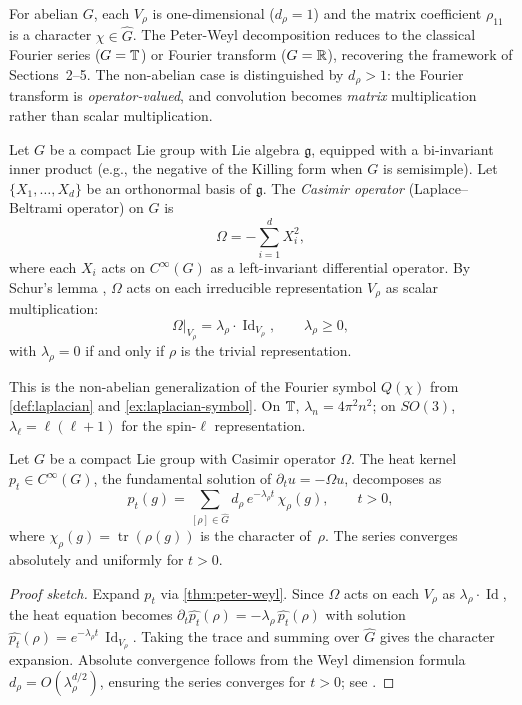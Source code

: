 For abelian $G$, each $V_\rho$ is one-dimensional ($d_\rho = 1$) and the matrix coefficient $\rho_{11}$ is a character $\chi \in \widehat{G}$. The Peter-Weyl decomposition reduces to the classical Fourier series ($G = \mathbb{T}$) or Fourier transform ($G = \mathbb{R}$), recovering the framework of Sections~2--5. The non-abelian case is distinguished by $d_\rho > 1$: the Fourier transform is \emph{operator-valued}, and convolution becomes \emph{matrix} multiplication rather than scalar multiplication.

\begin{definition}\label{def:casimir}
Let $G$ be a compact Lie group with Lie algebra $\mathfrak{g}$, equipped with a bi-invariant inner product (e.g., the negative of the Killing form when $G$ is semisimple). Let $\{X_1, \ldots, X_d\}$ be an orthonormal basis of $\mathfrak{g}$. The \emph{Casimir operator} (Laplace--Beltrami operator) on $G$ is
\[
\Omega = -\sum_{i=1}^d X_i^2,
\]
where each $X_i$ acts on $C^\infty(G)$ as a left-invariant differential operator. By Schur's lemma \cite[Proposition~10.7]{Hall}, $\Omega$ acts on each irreducible representation $V_\rho$ as scalar multiplication:
\[
\Omega\big|_{V_\rho} = \lambda_\rho \cdot \operatorname{Id}_{V_\rho}, \qquad \lambda_\rho \geq 0,
\]
with $\lambda_\rho = 0$ if and only if $\rho$ is the trivial representation.
\end{definition}

This is the non-abelian generalization of the Fourier symbol $Q(\chi)$ from \cref{def:laplacian} and \cref{ex:laplacian-symbol}. On $\mathbb{T}$, $\lambda_n = 4\pi^2 n^2$; on $SO(3)$, $\lambda_\ell = \ell(\ell+1)$ for the spin-$\ell$ representation.

\begin{proposition}\label{prop:heat-compact}
Let $G$ be a compact Lie group with Casimir operator $\Omega$. The heat kernel $p_t \in C^\infty(G)$, the fundamental solution of $\partial_t u = -\Omega u$, decomposes as
\[
p_t(g) = \sum_{[\rho] \in \widehat{G}} d_\rho\, e^{-\lambda_\rho t}\, \chi_\rho(g), \qquad t > 0,
\]
where $\chi_\rho(g) = \operatorname{tr}(\rho(g))$ is the character of~$\rho$. The series converges absolutely and uniformly for $t > 0$.
\end{proposition}

\begin{proof}[Proof sketch]
Expand $p_t$ via \cref{thm:peter-weyl}. Since $\Omega$ acts on each $V_\rho$ as $\lambda_\rho \cdot \operatorname{Id}$, the heat equation becomes $\partial_t \widehat{p_t}(\rho) = -\lambda_\rho\, \widehat{p_t}(\rho)$ with solution $\widehat{p_t}(\rho) = e^{-\lambda_\rho t}\, \operatorname{Id}_{V_\rho}$. Taking the trace and summing over $\widehat{G}$ gives the character expansion. Absolute convergence follows from the Weyl dimension formula $d_\rho = O(\lambda_\rho^{d/2})$, ensuring the series converges for $t > 0$; see \cite[\S 3]{Diaconis}.
\end{proof}

